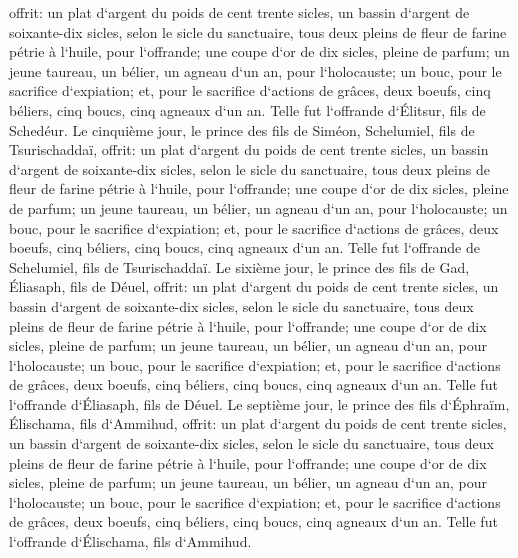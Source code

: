 \verse offrit: un plat d`argent du poids de cent trente sicles, un bassin d`argent de soixante-dix sicles, selon le sicle du sanctuaire, tous deux pleins de fleur de farine pétrie à l`huile, pour l`offrande; 
\verse une coupe d`or de dix sicles, pleine de parfum; 
\verse un jeune taureau, un bélier, un agneau d`un an, pour l`holocauste; 
\verse un bouc, pour le sacrifice d`expiation; 
\verse et, pour le sacrifice d`actions de grâces, deux boeufs, cinq béliers, cinq boucs, cinq agneaux d`un an. Telle fut l`offrande d`Élitsur, fils de Schedéur. 
\verse Le cinquième jour, le prince des fils de Siméon, Schelumiel, fils de Tsurischaddaï, 
\verse offrit: un plat d`argent du poids de cent trente sicles, un bassin d`argent de soixante-dix sicles, selon le sicle du sanctuaire, tous deux pleins de fleur de farine pétrie à l`huile, pour l`offrande; 
\verse une coupe d`or de dix sicles, pleine de parfum; 
\verse un jeune taureau, un bélier, un agneau d`un an, pour l`holocauste; 
\verse un bouc, pour le sacrifice d`expiation; 
\verse et, pour le sacrifice d`actions de grâces, deux boeufs, cinq béliers, cinq boucs, cinq agneaux d`un an. Telle fut l`offrande de Schelumiel, fils de Tsurischaddaï. 
\verse Le sixième jour, le prince des fils de Gad, Éliasaph, fils de Déuel, 
\verse offrit: un plat d`argent du poids de cent trente sicles, un bassin d`argent de soixante-dix sicles, selon le sicle du sanctuaire, tous deux pleins de fleur de farine pétrie à l`huile, pour l`offrande; 
\verse une coupe d`or de dix sicles, pleine de parfum; 
\verse un jeune taureau, un bélier, un agneau d`un an, pour l`holocauste; 
\verse un bouc, pour le sacrifice d`expiation; 
\verse et, pour le sacrifice d`actions de grâces, deux boeufs, cinq béliers, cinq boucs, cinq agneaux d`un an. Telle fut l`offrande d`Éliasaph, fils de Déuel. 
\verse Le septième jour, le prince des fils d`Éphraïm, Élischama, fils d`Ammihud, 
\verse offrit: un plat d`argent du poids de cent trente sicles, un bassin d`argent de soixante-dix sicles, selon le sicle du sanctuaire, tous deux pleins de fleur de farine pétrie à l`huile, pour l`offrande; 
\verse une coupe d`or de dix sicles, pleine de parfum; 
\verse un jeune taureau, un bélier, un agneau d`un an, pour l`holocauste; 
\verse un bouc, pour le sacrifice d`expiation; 
\verse et, pour le sacrifice d`actions de grâces, deux boeufs, cinq béliers, cinq boucs, cinq agneaux d`un an. Telle fut l`offrande d`Élischama, fils d`Ammihud. 
